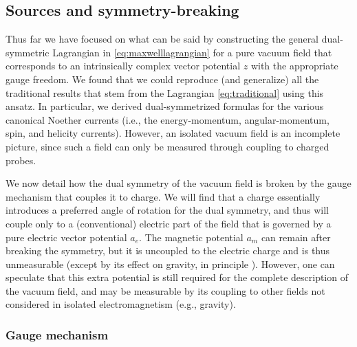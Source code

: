 \documentclass[1p,sort&compress]{elsarticle}
\numberwithin{equation}{section}
\begin{document}

\subsection{Sources and symmetry-breaking}\label{sec:lagrangiansource}


Thus far we have focused on what can be said by constructing the general dual-symmetric Lagrangian in \eqref{eq:maxwelllagrangian} for a pure vacuum field that corresponds to an intrinsically complex vector potential $z$ with the appropriate gauge freedom.  We found that we could reproduce (and generalize) all the traditional results that stem from the Lagrangian \eqref{eq:traditional} using this ansatz.  In particular, we derived dual-symmetrized formulas for the various canonical Noether currents (i.e., the energy-momentum, angular-momentum, spin, and helicity currents). However, an isolated vacuum field is an incomplete picture, since such a field can only be measured through coupling to charged probes.

We now detail how the dual symmetry of the vacuum field is broken by the gauge mechanism that couples it to charge.  We will find that a charge essentially introduces a preferred angle of rotation for the dual symmetry, and thus will couple only to a (conventional) electric part of the field that is governed by a pure electric vector potential $a_e$.  The magnetic potential $a_m$ can remain after breaking the symmetry, but it is uncoupled to the electric charge and is thus unmeasurable (except by its effect on gravity, in principle \cite{Vasconcellos2014}).  However, one can speculate that this extra potential is still required for the complete description of the vacuum field, and may be measurable by its coupling to other fields not considered in isolated electromagnetism (e.g., gravity).


\subsubsection{Gauge mechanism}\label{sec:gauge}

\end{document}
